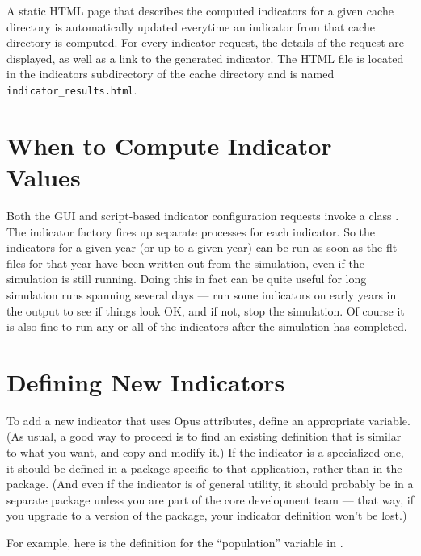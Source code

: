 A static HTML page that describes the computed indicators for a given
cache directory is automatically updated everytime an indicator from 
that cache directory is computed. For every indicator request, the 
details of the request are displayed, as well as a link to the generated 
indicator. The HTML file is located in the indicators subdirectory of the 
cache directory and is named \verb|indicator_results.html|.

\section{When to Compute Indicator Values}
\indicatorsindex\attributesindex

Both the GUI and script-based indicator configuration requests invoke a
class .  The indicator factory fires up separate
processes for each indicator.  So the indicators \indicatorsindex for a
given year (or up to a given year) can be run as soon as the flt files for
that year have been written out from the simulation, even if the simulation
is still running.  Doing this in fact can be quite useful for long
simulation runs spanning several days --- run some indicators
\indicatorsindex on early years in the output to see if things look OK, and
if not, stop the simulation.  Of course it is also fine to run any or all
of the indicators \indicatorsindex after the simulation has completed.

\section{Defining New Indicators}
\indicatorsindex\attributesindex

To add a new indicator \indicatorsindex that uses Opus attributes,
\attributesindex define an appropriate variable. \variablesindex (As usual,
a good way to proceed is to find an existing definition that is similar to
what you want, and copy and modify it.)  If the indicator \indicatorsindex
is a specialized one, it should be defined in a package specific to that
application, rather than in the  package.  (And even if
the indicator \indicatorsindex is of general utility, it should probably be
in a separate package unless you are part of the core development team ---
that way, if you upgrade to a version of the  package,
your indicator \indicatorsindex definition won't be lost.)

For example, here is the definition for the ``population'' variable
\variablesindex in .

